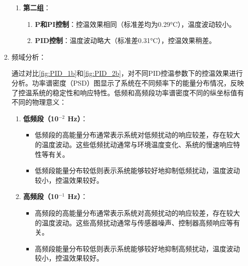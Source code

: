 \documentclass[dvipsnames, svgnames,a4paper,11pt]{article}
\begin{document}
\begin{enumerate}
\begin{enumerate}
                \item \textbf{第二组}：
                \begin{enumerate}
                    \item \textbf{P和PI控制}：控温效果相同（标准差均为0.29°C），温度波动较小。
                    \item \textbf{PID控制}：温度波动略大（标准差0.31°C），控温效果稍差。
                \end{enumerate}
            
            \end{enumerate}

        \item 频域分析：
        
            通过对比\cref{fig:PID_1b}和\cref{fig:PID_2b}，对不同PID控温参数下的控温效果进行分析。功率谱密度（PSD）图显示了系统在不同频率下的能量分布情况，反映了控温系统的稳定性和响应特性。低频和高频段功率谱密度不同的纵坐标值有不同的物理意义：

            \begin{enumerate}
                \item \textbf{低频段（10$^{-2}$ Hz）}：
                \begin{itemize}
                    \item 低频段的高能量分布通常表示系统对低频扰动的响应较差，存在较大的温度波动。这些低频扰动通常与环境温度变化、系统的慢速响应特性等有关。
                    \item 低频段能量分布较低则表示系统能够较好地抑制低频扰动，温度波动较小，控温效果较好。
                \end{itemize}
            
                \item \textbf{高频段（10$^{-1}$ Hz）}：
                \begin{itemize}
                    \item 高频段的高能量分布通常表示系统对高频扰动的响应较差，存在较大的温度波动。这些高频扰动通常与传感器噪声、控制器高频响应等有关。
                    \item 高频段能量分布较低则表示系统能够较好地抑制高频扰动，温度波动较小，控温效果较好。
                \end{itemize}
            \end{enumerate}
        

\end{enumerate}
\end{document}
